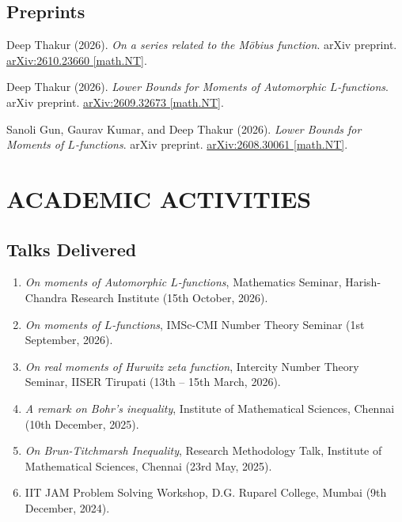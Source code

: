\documentclass[a4paper,9pt]{extarticle}
\begin{document}
	\subsection*{Preprints}
	\begin{enumerate}[label={[\arabic*]}]
	        \item Deep Thakur (2026). \textit{On a series related to the M\"obius function}. arXiv preprint. \href{https://arxiv.org/abs/2610.23660v1}{arXiv:2610.23660 [math.NT]}.
		\item Deep Thakur (2026). \textit{Lower Bounds for Moments of Automorphic $L$-functions}. arXiv preprint. \href{https://arxiv.org/abs/2609.32673}{arXiv:2609.32673 [math.NT]}.
		\item Sanoli Gun, Gaurav Kumar, and Deep Thakur (2026). \textit{Lower Bounds for Moments of $L$-functions}. arXiv preprint. \href{https://arxiv.org/abs/2608.30061}{arXiv:2608.30061 [math.NT]}.
	\end{enumerate}
	
	\section*{ACADEMIC ACTIVITIES}
	
	\subsection*{Talks Delivered}
	\begin{enumerate}
	        \item \textit{On moments of Automorphic $L$-functions}, Mathematics Seminar, Harish-Chandra Research Institute (15th October, 2026).
		\item \textit{On moments of $L$-functions}, IMSc-CMI Number Theory Seminar (1st September, 2026).
		\item \textit{On real moments of Hurwitz zeta function}, Intercity Number Theory Seminar, IISER Tirupati (13th -- 15th March, 2026).
		\item \textit{A remark on Bohr's inequality}, Institute of Mathematical Sciences, Chennai (10th December, 2025).
		\item \textit{On Brun-Titchmarsh Inequality}, Research Methodology Talk, Institute of Mathematical Sciences, Chennai (23rd May, 2025).
		\item IIT JAM Problem Solving Workshop, D.G. Ruparel College, Mumbai (9th December, 2024).
	\end{enumerate}
	
\end{document}
